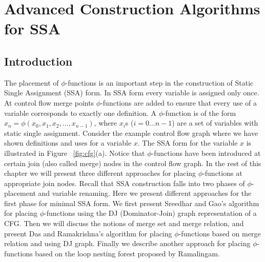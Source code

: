 \chapter{Advanced Construction Algorithms for SSA
   }
\label{chap:alternative_ssa_construction_algorithms}
\graphicspath{{img/}{alternative_ssa_construction_algorithms/img/}{part1/alternative_ssa_construction_algorithms/img/}}

{

\def\p{$\phi$}
\def\st#1{\rlap{\raisebox{3.4pt}{\kern3pt{\scriptsize\it #1}}}{\rightarrow}}
\def\St#1{\rlap{\raisebox{3.4pt}{\kern3pt{\scriptsize\it #1}}}{\Rightarrow}}

\def\p{$\phi$}


\section{Introduction}

The  placement  of $\phi$-functions is an important step in the construction of Static Single Assignment (SSA) form.
In SSA form every variable is assigned 
only once. At control flow merge points $\phi$-functions are added to ensure that every use of a variable corresponds to exactly one definition. 
A $\phi$-function is of the form $x_n = \phi(x_0,x_1, x_2, \ldots, x_{n-1})$,
where $x_i$s ($i = 0 \ldots n-1$) are a set of variables with static single assignment. 
Consider the example control flow graph where we have shown definitions and uses for 
a variable $x$. The SSA form for the variable $x$ is illustrated in Figure ~\ref{fig:cfg}(a). 
Notice that $\phi$-functions
have been introduced at certain join (also called merge) nodes in the control flow graph.
In the rest of this chapter we will present three different approaches  for placing $\phi$-functions
at appropriate join nodes. Recall that SSA construction falls into two phases of $\phi$-placement and variable renaming. Here we present different approaches for the first phase for minimal SSA form. We first present Sreedhar and Gao's algorithm for
placing \p-functions using the DJ (Dominator-Join) graph representation of a CFG.
Then we will discuss the notions of merge set and merge relation, and present Das and Ramakrishna's algorithm for placing \p-functions based on merge relation and using DJ graph. Finally
we describe another approach for placing \p-functions based on the loop nesting forest proposed by Ramalingam.

}
